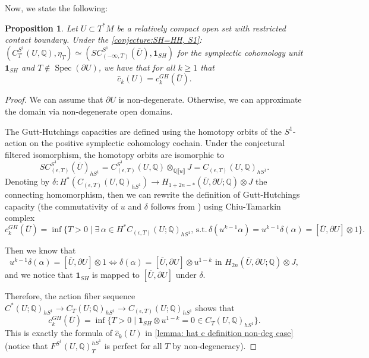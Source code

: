 \documentclass[11pt]{amsart}
\numberwithin{equation}{section}
\theoremstyle{plain}
\newtheorem{Prop}[prop]{Proposition}
\theoremstyle{definition}
\theoremstyle{remark}
\newcommand{\bQ} { {\mathbb{Q}}}
\newcommand{\fpw}[1]{{\llbracket #1\rrbracket}}
\newcommand\Spec{\operatorname{Spec}}
\begin{document}
Now, we state the following:
\begin{Prop}\label{prop: GH=CT capacity level}Let $U\subset T^*M$ be a relatively compact open set with restricted contact boundary. Under the \autoref{conjecture:SH=HH, S1}: $(C_T^{S^1}(U,\bQ),\eta_T)\simeq (SC^{S^1}_{(-\infty,T)}(\overline{U}),\mathbf{1}_{SH})$ for the symplectic cohomology unit $\mathbf{1}_{SH}$ and $T\notin \Spec(\partial U)$, we have that for all $k\geq 1$ that
\[\widehat{c}_k(U)=c_k^{GH}(\overline{U}).\]
\end{Prop}
\begin{proof}We can assume that $\partial U$ is non-degenerate. Otherwise, we can approximate the domain via non-degenerate open domains.

The Gutt-Hutchings capacities are defined using the homotopy orbits of the $S^1$-action on the positive symplectic cohomology cochain. Under the conjectural filtered isomorphism, the homotopy orbits are isomorphic to
\[SC^{S^1}_{(\epsilon,T)}(\overline{U})_{hS^1}=C^{S^1}_{(\epsilon,T)}(U,\bQ) \otimes_{\bQ\fpw{u}} J =C_{(\epsilon,T)}(U,\bQ)_{hS^1}.\]
Denoting by $\delta: H^*(C_{(\epsilon,T)}(U,\bQ)_{hS^1}) \to H_{1+2n-*}(\overline{U},\partial U; \bQ)\otimes J$ the connecting homomorphism, then we can rewrite the definition of Gutt-Hutchings capacity \cite[Definition 4.1]{gutthutchings2018capacities} (the commutativity of $u$ and $\delta$ follows from \cite[Proposition 3.1]{gutthutchings2018capacities}) using Chiu-Tamarkin complex
\[c_k^{GH}(\overline{U})= \inf\{T > 0 \mid \exists\,\alpha \in H^*C_{(\epsilon,T)}(U; \bQ)_{hS^1}, \,\text{s.t.}\,\delta(u^{k-1}\alpha)=u^{k-1}\delta(\alpha) = [\overline{U},\partial U]\otimes 1\}.\]

Then we know that
\[u^{k-1}\delta(\alpha) = [\overline{U},\partial U]\otimes 1 \iff \delta(\alpha)=[\overline{U},\partial U]\otimes u^{1-k} \text{ in }H_{2n}(\overline{U},\partial U; \bQ)\otimes J,\]
and we notice that $\mathbf{1}_{SH}$ is mapped to $[\overline{U},\partial U]$ under $\delta$.

Therefore, the action fiber sequence $C^{*}(U; \bQ)_{hS^1} \to C_T(U; \bQ)_{hS^1} \to C_{(\epsilon,T)}(U; \bQ)_{hS^1}$ shows that
\[c_k^{GH}(\overline{U})= \inf\{T > 0 \mid \mathbf{1}_{SH} \otimes u^{1-k} = 0 \in C_T(U,\bQ)_{hS^1}\}.\]
This is exactly the formula of $\widehat{c}_k(U)$ in \autoref{lemma: hat c definition non-deg case} (notice that $F^{S^1}(U,\bQ)^{hS^1}_T$ is perfect for all $T$ by non-degeneracy).
\end{proof}
\end{document}
